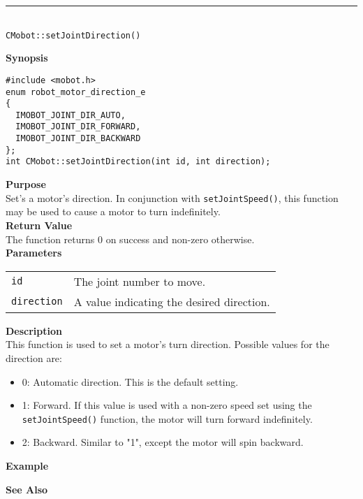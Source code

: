 \noindent
\vspace{5pt}
\rule{4.5in}{0.015in}\\
\noindent
{\LARGE \texttt{CMobot::setJointDirection()}}\\
{}

\noindent
{\bf Synopsis}\\
\begin{verbatim}
#include <mobot.h>
enum robot_motor_direction_e
{
  IMOBOT_JOINT_DIR_AUTO,
  IMOBOT_JOINT_DIR_FORWARD,
  IMOBOT_JOINT_DIR_BACKWARD
};
int CMobot::setJointDirection(int id, int direction);
\end{verbatim}

\noindent
{\bf Purpose}\\
Set's a motor's direction. In conjunction with \texttt{setJointSpeed()}, this
function may be used to cause a motor to turn indefinitely.\\

\noindent
{\bf Return Value}\\
The function returns 0 on success and non-zero otherwise.\\

\noindent
{\bf Parameters}
\vspace{-0.1in}
\begin{description}
\item               
\begin{tabular}{p{20 mm}p{145 mm}}
\texttt{id} & The joint number to move. \\
\texttt{direction} & A value indicating the desired direction.
\end{tabular}
\end{description}

\noindent
{\bf Description}\\
This function is used to set a motor's turn direction. Possible values for the
direction are:
\begin{itemize}
\item 0: Automatic direction. This is the default setting. 
\item 1: Forward. If this value is used with a non-zero speed set using the
\texttt{setJointSpeed()} function, the motor will turn forward indefinitely.
\item 2: Backward. Similar to "1", except the motor will spin backward.
\end{itemize}

\noindent
{\bf Example}\\
\noindent

\noindent
{\bf See Also}\\

